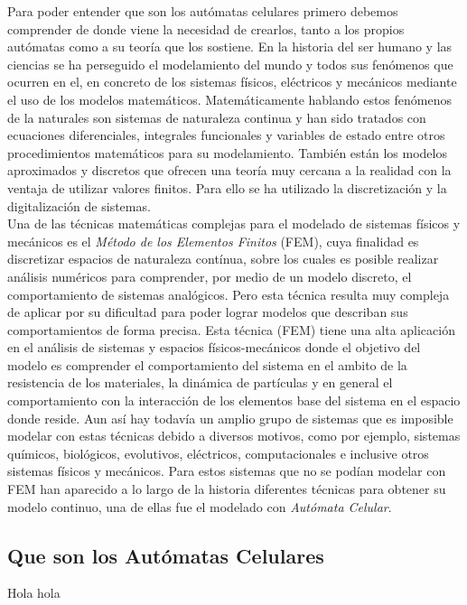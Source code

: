 %

Para poder entender que son los autómatas celulares primero debemos comprender de donde viene la necesidad de crearlos, tanto a los propios autómatas como a su teoría que los sostiene. En la historia del ser humano y las ciencias se ha perseguido el modelamiento del mundo y todos sus fenómenos que ocurren en el, en concreto de los sistemas físicos, eléctricos y mecánicos mediante el uso de los modelos matemáticos. Matemáticamente hablando estos fenómenos de la naturales son sistemas de naturaleza continua y han sido tratados con ecuaciones diferenciales, integrales funcionales y variables de estado entre otros procedimientos matemáticos para su modelamiento. También están los modelos aproximados y discretos que ofrecen una teoría muy cercana a la realidad con la ventaja de utilizar valores finitos. Para ello se ha utilizado la discretización y la digitalización de sistemas.\\

Una de las técnicas matemáticas complejas para el modelado de sistemas físicos y mecánicos es el \textit{Método de los Elementos Finitos} (FEM), cuya finalidad es discretizar espacios de naturaleza contínua, sobre los cuales es posible realizar análisis numéricos para comprender, por medio de un modelo discreto, el comportamiento de sistemas analógicos. Pero esta técnica resulta muy compleja de aplicar por su dificultad para poder lograr modelos que describan sus comportamientos de forma precisa. Esta técnica (FEM) tiene una alta aplicación en el análisis de sistemas y espacios físicos-mecánicos donde el objetivo del modelo es comprender el comportamiento del sistema en el ambito de la resistencia de los materiales, la dinámica de partículas y en general el comportamiento con la interacción  de los elementos base del sistema en el espacio donde reside.
Aun así hay todavía un amplio grupo de sistemas que es imposible modelar con estas técnicas debido a diversos motivos, como por ejemplo, sistemas químicos, biológicos, evolutivos, eléctricos, computacionales e inclusive otros sistemas físicos y mecánicos. Para estos sistemas que no se podían modelar con FEM han aparecido a lo largo de la historia diferentes técnicas para obtener su modelo continuo, una de ellas fue el modelado con \textit{Autómata Celular}.




\subsection{Que son los Autómatas Celulares}
Hola \cite{Teoria_von_neumann} hola
